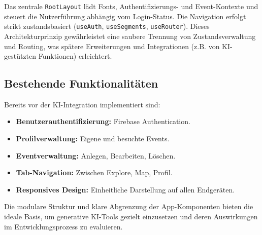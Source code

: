 Das zentrale \texttt{RootLayout} lädt Fonts, Authentifizierungs- und
Event-Kontexte und steuert die Nutzerführung abhängig vom Login-Status. Die
Navigation erfolgt strikt zustandsbasiert (\texttt{useAuth},
\texttt{useSegments}, \texttt{useRouter}). Dieses Architekturprinzip
gewährleistet eine saubere Trennung von Zustandsverwaltung und Routing, was
spätere Erweiterungen und Integrationen (z.B. von KI-gestützten Funktionen)
erleichtert.

\subsection{Bestehende Funktionalitäten}

Bereits vor der KI-Integration implementiert sind:
\begin{itemize}
    \item \textbf{Benutzerauthentifizierung:} Firebase Authentication.
    \item \textbf{Profilverwaltung:} Eigene und besuchte Events.
    \item \textbf{Eventverwaltung:} Anlegen, Bearbeiten, Löschen.
    \item \textbf{Tab-Navigation:} Zwischen Explore, Map, Profil.
    \item \textbf{Responsives Design:} Einheitliche Darstellung auf allen Endgeräten.
\end{itemize}

Die modulare Struktur und klare Abgrenzung der App-Komponenten bieten die
ideale Basis, um generative KI-Tools gezielt einzusetzen und deren Auswirkungen
im Entwicklungsprozess zu evaluieren.